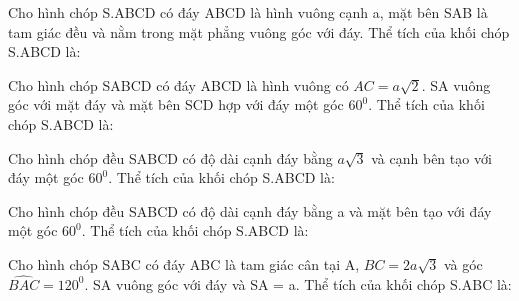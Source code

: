 



\begin{vnmultiplechoice}[ rearrange=yes, keycolumns=5]%

\begin{question}%
Cho hình chóp S.ABCD có đáy ABCD là hình vuông cạnh a, mặt bên SAB là tam giác đều và nằm trong mặt phẳng vuông góc với đáy. Thể tích của khối chóp S.ABCD là:
 
\datcot
\bonpa
{}
{}
{}
{}
\end{question}

\begin{question}%
Cho hình chóp SABCD có đáy ABCD là hình vuông có $AC = a\sqrt 2$. SA vuông góc với mặt đáy và mặt bên SCD hợp với đáy một góc $60^0$. Thể tích của khối chóp S.ABCD là:
 
\datcot
\bonpa
{}
{}
{}
{}
\end{question}

\begin{question}%
Cho hình chóp đều SABCD có độ dài cạnh đáy bằng $a\sqrt 3$ và cạnh bên tạo với đáy một góc $60^0$. Thể tích của khối chóp S.ABCD là:
 
\datcot
\bonpa
{}
{}
{}
{}
\end{question}

\begin{question}%
Cho hình chóp đều SABCD có độ dài cạnh đáy bằng a và mặt bên tạo với đáy một góc $60^0$. Thể tích của khối chóp S.ABCD là:
 
\datcot
\bonpa
{}
{}
{}
{}
\end{question}

\begin{question}%
Cho hình chóp SABC có đáy ABC là tam giác cân tại A, $BC = 2a\sqrt 3$ và góc $\widehat{BAC} = 120^0$. SA vuông góc với đáy và SA = a. Thể tích của khối chóp S.ABC là:  
 
\datcot
\bonpa
{}
{}
{}
{}
\end{question}


\end{vnmultiplechoice}
